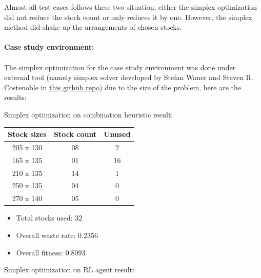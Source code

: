 \documentclass[a4paper]{article}
\begin{document}
    \pagebreak
    \noindent Almost all test cases follows these two situation, either the simplex optimization did not reduce the stock count or only reduces it by one. However, the simplex method did shake up the arrangements of chosen stocks.
    \\ \\
    \textbf{Case study environment:}
    \\ \\
    The simplex optimization for the case study environment was done under external tool (namely simplex solver developed by Stefan Waner and Steven R. Costenoble in \href{https://github.com/srcostenoble/simplex}{this github repo}) due to the size of the problem, here are the results:

    \begin{center}
    \begin{minipage}{0.45\textwidth}
        Simplex optimization on combination heuristic result:\\
        
        \centering
        \begin{tabular}{|c|c|c|}
        \hline
        \rowcolor{gray!30} \textbf{Stock sizes} & \textbf{Stock count} & \textbf{Unused} \\ \hline
        205 x 130 & 08 & 2 \\ \hline
        165 x 135 & 01 & 16 \\ \hline
        210 x 135 & 14 & 1 \\ \hline
        250 x 135 & 04 & 0 \\ \hline
        270 x 140 & 05 & 0 \\ \hline
        \end{tabular}
        \centering
        \begin{itemize}
            \item Total stocks used: 32 
            \item Overall waste rate: 0.2356 
            \item Overall fitness: 0.8093
        \end{itemize}
    \end{minipage}
    \hfill
    \begin{minipage}{0.45\textwidth}
        Simplex optimization on RL agent result:\\ \\
        

\end{minipage}
\end{center}
\end{document}
